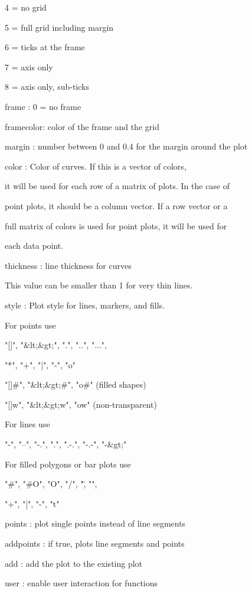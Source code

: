 \documentclass{article}
\begin{document}
            4 = no grid


            5 = full grid including margin


            6 = ticks at the frame


            7 = axis only


            8 = axis only, sub-ticks


frame     : 0 = no frame


framecolor: color of the frame and the grid


margin    : number between 0 and 0.4 for the margin around the plot


color     : Color of curves. If this is a vector of colors,


            it will be used for each row of a matrix of plots. In the case of


            point plots, it should be a column vector. If a row vector or a


            full matrix of colors is used for point plots, it will be used for


            each data point.


thickness : line thickness for curves


            This value can be smaller than 1 for very thin lines.


style     : Plot style for lines, markers, and fills.


            For points use


            "[]", "&lt;&gt;", ".", "..", "...",


            "*", "+", "|", "-", "o"


            "[]#", "&lt;&gt;#", "o#" (filled shapes)


            "[]w", "&lt;&gt;w", "ow" (non-transparent)


            For lines use


            "-", "--", "-.", ".", ".-.", "-.-", "-&gt;"


            For filled polygons or bar plots use


            "#", "#O", "O", "/", "\", "\/",


            "+", "|", "-", "t"


points    : plot single points instead of line segments


addpoints : if true, plots line segments and points


add       : add the plot to the existing plot


user      : enable user interaction for functions
\end{document}
